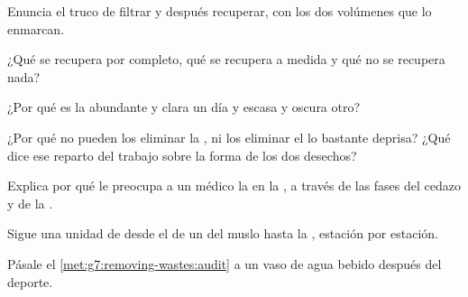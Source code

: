 \begin{exercise}[$\star$]\label{exo:g7:removing-wastes:4}
Enuncia el truco de filtrar y después recuperar, con los dos volúmenes
que lo enmarcan.
\end{exercise}

\begin{exercise}[$\star$]\label{exo:g7:removing-wastes:5}
¿Qué se recupera por completo, qué se recupera a medida y qué no se
recupera nada?
\end{exercise}

\begin{exercise}[$\star$]\label{exo:g7:removing-wastes:6}
¿Por qué es la  abundante y clara un día y escasa y oscura otro?
\end{exercise}

\begin{exercise}[$\star\star$]\label{exo:g7:removing-wastes:7}
¿Por qué no pueden los  eliminar la , ni los 
eliminar el  lo bastante deprisa? ¿Qué dice ese
reparto del trabajo sobre la forma de los dos desechos?
\end{exercise}

\begin{exercise}[$\star\star$]\label{exo:g7:removing-wastes:8}
Explica por qué le preocupa a un médico la  en la , a
través de las fases del cedazo y de la .
\end{exercise}

\begin{exercise}[$\star\star$]\label{exo:g7:removing-wastes:9}
Sigue una unidad de  desde el  de un  del muslo hasta
la , estación por estación.
\end{exercise}

\begin{exercise}[$\star\star$]\label{exo:g7:removing-wastes:10}
Pásale el \cref{met:g7:removing-wastes:audit} a un vaso de agua bebido
después del deporte.
\end{exercise}

